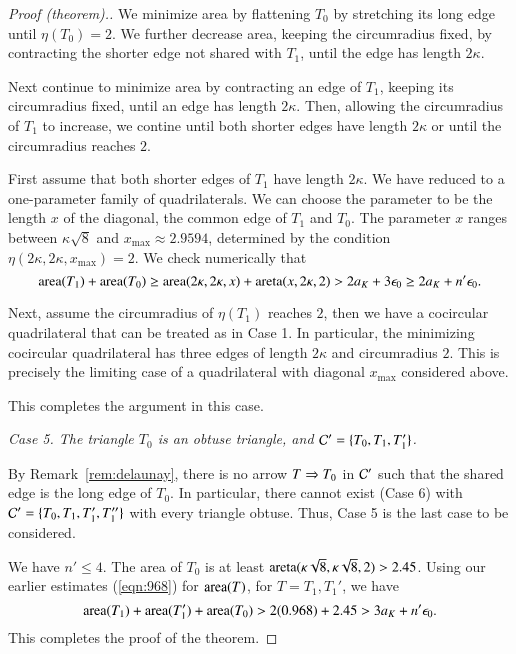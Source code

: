 \begin{proof}[Proof (theorem).]
We minimize area by flattening $T_0$ by stretching its long edge until
$\eta(T_0)=2$.  We further decrease area, keeping the circumradius
fixed, by contracting the shorter edge not shared with $T_1$, until
the edge has length $2\kappa$.

Next continue to minimize area by contracting an edge of $T_1$,
keeping its circumradius fixed, until an edge has length $2\kappa$.
Then, allowing the circumradius of $T_1$ to increase, we contine until
both shorter edges have length $2\kappa$ or until the circumradius
reaches $2$.

First assume that both shorter edges of $T_1$ have length $2\kappa$.
We have reduced to a one-parameter family of quadrilaterals.  We can
choose the parameter to be the length $x$ of the diagonal, the common
edge of $T_1$ and $T_0$.  The parameter $x$ ranges between
$\kappa\sqrt{8}$ and $x_{\max}\approx 2.9594$, determined by the
condition $\eta(2\kappa,2\kappa,x_{\max}) = 2$.  We check numerically
that
\[
{\operatorname{area}}(T_1) + {\operatorname{area}}(T_0) \ge {\operatorname{area}}(2\kappa,2\kappa,x) +
{\operatorname{areta}}(x,2\kappa,2) > 2a_K + 3 \epsilon_0 \ge 2a_K + n'\epsilon_0.
\] %

Next, assume the circumradius of $\eta(T_1)$ reaches $2$, then we
have a cocircular quadrilateral that can be treated as in Case 1.  In
particular, the minimizing cocircular quadrilateral has three edges of
length $2\kappa$ and circumradius $2$.  This is precisely the limiting
case of a quadrilateral with diagonal $x_{\max}$ considered above.

This completes the argument in this case.

{\it Case 5. The triangle $T_0$ is an obtuse triangle, and $\mathcal C'=\{T_0,T_1,T_1'\}$.}  

By Remark~\ref{rem:delaunay}, there is no arrow $T \Rightarrow T_0$ in $\mathcal C'$
such that the shared edge is the long edge of $T_0$.  In particular,
there cannot exist (Case 6) with $\mathcal C'=\{T_0,T_1,T_1',T_1''\}$ with
every triangle obtuse.  Thus, Case 5 is the last case to be
considered.

We have $n'\le 4$.
The area of $T_0$ is at least
${\operatorname{areta}}(\kappa\sqrt{8},\kappa\sqrt{8},2) > 2.45$.  
Using our earlier estimates (\ref{eqn:968})
for ${\operatorname{area}}(T)$, for $T=T_1,T_1'$, we
have
\[
{\operatorname{area}}(T_1) + {\operatorname{area}}(T_1') + {\operatorname{area}}(T_0) > 2 (0.968) + 2.45 > 3a_K + n'\epsilon_0.
\] %
This completes the proof of the theorem.
\end{proof}

